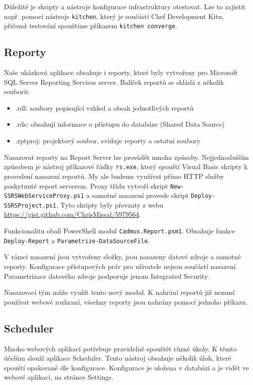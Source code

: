 Důležité je skripty a nástroje konfigurace infrastruktury otestovat. Lze to zajistit např. pomocí nástroje \texttt{kitchen}, který je součástí Chef Development Kitu, přičemž testování spouštíme příkazem \texttt{kitchen converge}. 

\subsection{Reporty}
Naše ukázková aplikace obsahuje i reporty, které byly vytvořeny pro Microsoft SQL Server Reporting Services server. Balíček reportů se skládá z několik souborů:
\begin{itemize}
\item .rdl: soubory popisující vzhled a obsah jednotlivých reportů
\item .rds: obsahují informace o přístupu do databáze (Shared Data Source)
\item .rptproj: projektový soubor, eviduje reporty a ostatní soubory
\end{itemize}

Nasazovat reporty na Report Server lze provádět mnoha způsoby. Nejjednodušším způsobem je nástroj příkazové řádky \texttt{rs.exe}, který spouští Visual Basic skripty k provedení nasazení reportů. My ale budeme využívat přímo HTTP služby poskytnuté report serverem. Proxy třídu vytvoří skript \texttt{New-SSRSWebServiceProxy.ps1} a samotné nasazení provede skript \texttt{Deploy-SSRSProject.ps1}. Tyto skripty byly převzaty z webu \url{https://gist.github.com/ChrisMissal/5979564}. 

Funkcionalitu obalí PowerShell modul \texttt{Cadmus.Report.psm1}. Obsahuje funkce \texttt{Deploy-Report} a \texttt{Parametrize-DataSourceFile}. 

V rámci nasazení jsou vytvořeny složky, jsou nasazeny datové zdroje a samotné reporty. Konfigurace přístupových práv pro uživatele nejsou součástí nasazení. Parametrizace datového zdroje podporuje jenom Integrated Security. 

Nasazovací tým může využít tento nový modul. K nahrání reportů již nemusí používat webové rozhraní, všechny reporty jsou nahrány pomocí jednoho příkazu.

\subsection{Scheduler}
Mnoho webových aplikací potřebuje pravidelně spouštět různé úkoly. K těmto účelům slouží aplikace Scheduler. Tento nástroj obsahuje několik úloh, které spouští opakovaně dle konfigurace. Konfigurace je uložena v databázi a je vidět ve webové aplikaci, na stránce Settings. 

